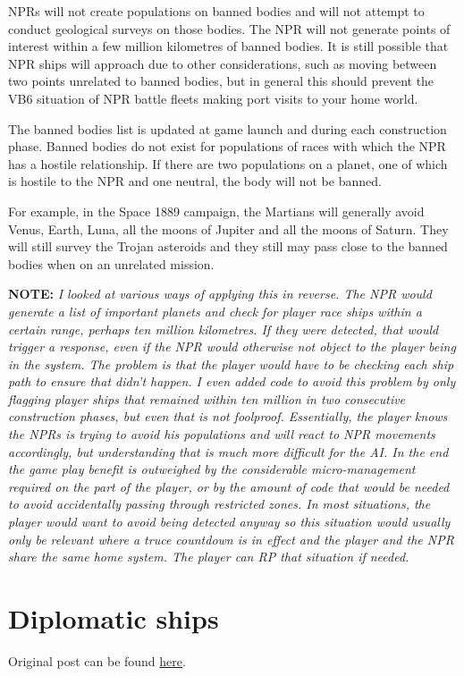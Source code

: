 \documentclass[10pt,a4paper,oneside]{article}
\begin{document}
NPRs will not create populations on banned bodies and will not attempt to conduct geological surveys on those bodies. The NPR will not generate points of interest within a few million kilometres of banned bodies. It is still possible that NPR ships will approach due to other considerations, such as moving between two points unrelated to banned bodies, but in general this should prevent the VB6 situation of NPR battle fleets making port visits to your home world.

The banned bodies list is updated at game launch and during each construction phase. Banned bodies do not exist for populations of races with which the NPR has a hostile relationship. If there are two populations on a planet, one of which is hostile to the NPR and one neutral, the body will not be banned.

For example, in the Space 1889 campaign, the Martians will generally avoid Venus, Earth, Luna, all the moons of Jupiter and all the moons of Saturn. They will still survey the Trojan asteroids and they still may pass close to the banned bodies when on an unrelated mission.

\textbf{NOTE:} \textit{I looked at various ways of applying this in reverse. The NPR would generate a list of important planets and check for player race ships within a certain range, perhaps ten million kilometres. If they were detected, that would trigger a response, even if the NPR would otherwise not object to the player being in the system. The problem is that the player would have to be checking each ship path to ensure that didn't happen. I even added code to avoid this problem by only flagging player ships that remained within ten million in two consecutive construction phases, but even that is not foolproof. Essentially, the player knows the NPRs is trying to avoid his populations and will react to NPR movements accordingly, but understanding that is much more difficult for the AI. In the end the game play benefit is outweighed by the considerable micro-management required on the part of the player, or by the amount of code that would be needed to avoid accidentally passing through restricted zones. In most situations, the player would want to avoid being detected anyway so this situation would usually only be relevant where a truce countdown is in effect and the player and the NPR share the same home system. The player can RP that situation if needed.}
\section{Diplomatic ships}\label{8_diplomatic_ships}
Original post can be found
\href{http://aurora2.pentarch.org/index.php?topic=8495.msg120024#msg120024}{here}.
\newline\newline
\end{document}

